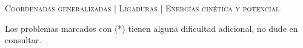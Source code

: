 \documentclass[11pt, spanish, a4paper, twoside]{article}
\begin{document}
\begin{center}
  \textsc{\large Coordenadas generalizadas | Ligaduras | Energías cinética y potencial}
\end{center}
\noindent
Los problemas marcados con (*) tienen alguna dificultad adicional, no dude en consultar.

\begin{enumerate}

%


\end{enumerate}
\end{document}
